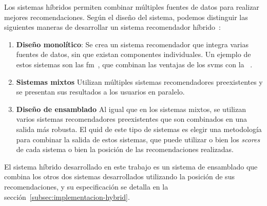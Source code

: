 Los sistemas híbridos permiten combinar múltiples fuentes de datos para realizar mejores recomendaciones. Según el diseño del sistema, podemos distinguir las siguientes maneras de desarrollar un sistema recomendador híbrido~\cite{aggarwal_recommender_2016}:

\begin{enumerate}
    \item \textbf{Diseño monolítico}: Se crea un sistema recomendador que integra varias fuentes de datos, sin que existan componentes individuales. Un ejemplo de estos sistemas son las \acrfull{fm}~\cite{rendle_factorization_2010}, que combinan las ventajas de los \glspl{svm} con la ~\cite{zhang_introduction_2022}.
    \item \textbf{Sistemas mixtos} Utilizan múltiples sistemas recomendadores preexistentes y se presentan sus resultados a los usuarios en paralelo.
    \item \textbf{Diseño de ensamblado} Al igual que en los sistemas mixtos, se utilizan varios sistemas recomendadores preexistentes que son combinados en una salida más robusta. El quid de este tipo de sistemas es elegir una metodología para combinar la salida de estos sistemas, que puede utilizar o bien los \textit{scores} de cada sistema o bien la posición de las recomendaciones realizadas.
\end{enumerate}

El sistema híbrido desarrollado en este trabajo es un sistema de ensamblado que combina los otros dos sistemas desarrollados utilizando la posición de sus recomendaciones, y su especificación se detalla en la sección~\ref{subsec:implementacion-hybrid}.



